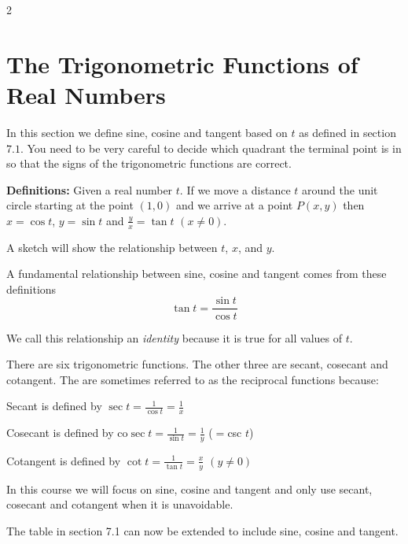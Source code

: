 \columnsep =30pt
\begin {multicols}{2}



\end {multicols}

\section{The Trigonometric Functions of Real Numbers}
In this section we define sine, cosine and tangent based on $t$ as defined in section $7.1$. You need to be very careful to decide which quadrant the terminal point is in
so that the signs of the trigonometric functions are correct. 

\textbf{Definitions:} Given a real number $t$. If we move a distance $t$ around the unit circle starting at the point $\left (1 ,0\right )$ and we arrive at a point $P (x ,y)$ then $x =\cos  t$, $y =\sin  t$ and $\frac{y}{x} =\tan  t$ $\left (x \neq 0\right )$. 

A sketch will show the relationship between
$t$, $x$, and $y$. 

A fundamental relationship between sine, cosine and tangent comes from these definitions
\begin{equation*}\tan  t =\frac{\sin  t}{\cos  t}
\end{equation*}

We call this relationship an \emph{identity} because it is true for all values
of $t$. 

There are six trigonometric functions. The other three are
secant, cosecant and cotangent. The are sometimes referred to as the reciprocal functions because: 

Secant is defined by $\sec  t =\frac{1}{\cos  t} =\frac{1}{x}$ 

Cosecant is defined by co$\sec  t =\frac{1}{\sin  t} =\frac{1}{y}$ ($ =$csc $t$) 

Cotangent is defined by $\cot  t =\frac{1}{\tan  t} =\frac{x}{y}$ $\left (y \neq 0\right )$ 

In this course we will focus on sine, cosine
and tangent and only use secant, cosecant and cotangent when it is unavoidable. 

The table in section 7.1 can now be extended to include
sine, cosine and tangent. 

